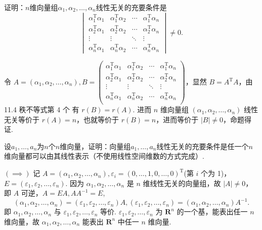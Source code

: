 \begin{exercise}
\begin{exgroup}
        \item 证明：$n$维向量组$\alpha_1,\alpha_2,\ldots,\alpha_n$线性无关的充要条件是
        \[\begin{vmatrix}
                \alpha_1^\mathrm{T}\alpha_1 & \alpha_1^\mathrm{T}\alpha_2 & \cdots & \alpha_1^\mathrm{T}\alpha_n \\
                \alpha_2^\mathrm{T}\alpha_1 & \alpha_2^\mathrm{T}\alpha_2 & \cdots & \alpha_2^\mathrm{T}\alpha_n \\
                \vdots                      & \vdots                      & \ddots & \vdots                      \\
                \alpha_n^\mathrm{T}\alpha_1 & \alpha_n^\mathrm{T}\alpha_2 & \cdots & \alpha_n^\mathrm{T}\alpha_n
            \end{vmatrix}\neq 0.\]
        \begin{answer}
            令 $A = (\alpha_1, \alpha_2, \ldots, \alpha_n), B = \begin{pmatrix}
                \alpha_1^{\mathrm{T}}\alpha_1 & \alpha_1^{\mathrm{T}}\alpha_2 & \cdots & \alpha_1^{\mathrm{T}}\alpha_n \\
                \alpha_2^{\mathrm{T}}\alpha_1 & \alpha_2^{\mathrm{T}}\alpha_2 & \cdots & \alpha_2^{\mathrm{T}}\alpha_n \\
                \vdots                        & \vdots                        & \ddots & \vdots                        \\
                \alpha_n^{\mathrm{T}}\alpha_1 & \alpha_n^{\mathrm{T}}\alpha_2 & \cdots & \alpha_n^{\mathrm{T}}\alpha_n \\
            \end{pmatrix}$，显然 $B = A^{\mathrm{T}}A$，由 {11.4 秩不等式第 4 个} 有 $r(B) = r(A)$. 进而 $n$ 维向量组 $(\alpha_1, \alpha_2, \ldots, \alpha_n)$ 线性无关等价于 $r(A) = n$，也就等价于 $r(B) = n$，进而等价于 $\lvert B \rvert \neq 0$，命题得证. %
        \end{answer}

        \item 设$a_1,\ldots,a_n$为$n$个$n$维向量，证明：向量组$a_1,\ldots,a_n$线性无关的充要条件是任一个$n$维向量都可以由其线性表示（不使用线性空间维数的方式完成）.
        \begin{answer}
            $(\implies)$ 记 $A = (\alpha_1, \alpha_2, \ldots, \alpha_n), \varepsilon_i = (0, \ldots, 1, 0, \ldots, 0)^{\mathrm{T}}$(第 $i$ 个为 1)，$E = (\varepsilon_1, \varepsilon_2, \ldots, \varepsilon_n)$. 因为 $\alpha_1, \alpha_2, \ldots, \alpha_n$ 是 $n$ 维线性无关的向量组，故 $\lvert A \rvert \neq 0$，即 $A$ 可逆，$A = EA, AA^{-1} = E$,\[(\alpha_1, \alpha_2, \ldots, \alpha_n) = (\varepsilon_1, \varepsilon_2, \ldots, \varepsilon_n)A, (\varepsilon_1, \varepsilon_2, \ldots, \varepsilon_n) = (\alpha_1, \alpha_2, \ldots, \alpha_n)A^{-1}.\] 即 $\alpha_1, \alpha_2, \ldots, \alpha_n$ 与 $\varepsilon_1, \varepsilon_2, \ldots, \varepsilon_n$ 等价. $\varepsilon_1, \varepsilon_2, \ldots, \varepsilon_n$ 为 $\mathbf{R}^n$ 的一个基，能表出任一 $n$ 维向量，故 $\alpha_1, \alpha_2, \ldots, \alpha_n$ 能表出 $\mathbf{R}^n$ 中任一 $n$ 维向量.


\end{answer}
\end{exgroup}
\end{exercise}
